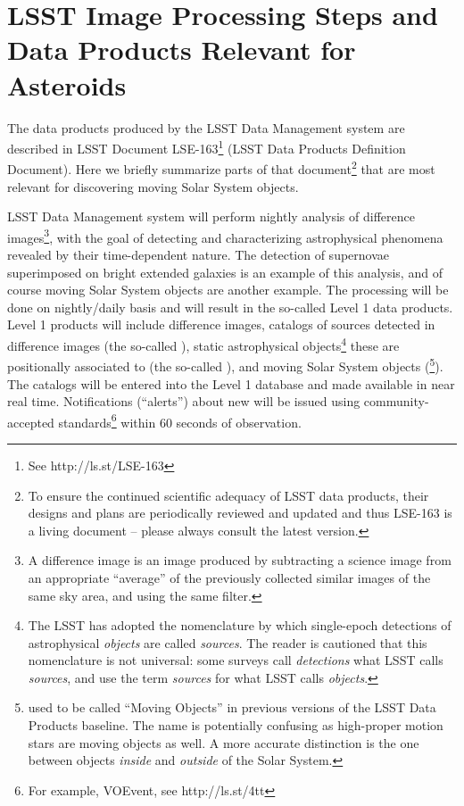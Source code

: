 \section{LSST Image Processing Steps and Data Products Relevant for Asteroids} \label{sec:AppA}

The data products produced by the LSST Data Management system are described in 
LSST Document LSE-163\footnote{See http://ls.st/LSE-163} (LSST Data Products
Definition Document). Here we briefly summarize parts of that
document\footnote{To ensure the continued scientific adequacy of LSST data 
products, their designs and plans are periodically reviewed and updated and
thus LSE-163 is a living document -- please always consult the latest version.}
that are most relevant for discovering moving Solar System objects. 

LSST Data Management system will perform nightly analysis of difference images\footnote{A difference
image is an image produced by subtracting a science image from an appropriate 
``average'' of the previously collected similar images of the same sky area, and using the 
same filter.}, with the goal of detecting and characterizing astrophysical phenomena 
revealed by their time-dependent nature. The detection of supernovae superimposed 
on bright extended galaxies is an example of this analysis, and of course moving Solar
System objects are another example. The processing will be done on nightly/daily 
basis and will result in the so-called Level 1 data products. Level 1 products will include 
difference images, catalogs of sources detected in difference images (the so-called
\DIASources), static astrophysical objects\footnote{The LSST has adopted the nomenclature by 
which single-epoch detections of astrophysical {\em objects} are called {\em sources}. 
The reader is cautioned that this nomenclature is not universal: some surveys call 
{\em detections} what LSST calls {\em sources}, and use the term {\em sources} for what 
LSST calls {\em objects}.} these \DIASources are positionally associated to (the so-called \DIAObjects), 
and moving Solar System objects (\SSObjects\footnote{\SSObjects used to be called 
``Moving Objects'' in previous versions of the LSST Data Products baseline. The name is 
potentially confusing as high-proper motion stars are moving objects as well. A more 
accurate distinction is the one between objects {\em inside} and {\em outside} of the Solar 
System.}). The catalogs will be entered into the Level 1 database and made available in near 
real time. Notifications (``alerts'') about new \DIASources will be issued using 
community-accepted standards\footnote{For example, VOEvent, see http://ls.st/4tt} within 
60 seconds of observation. 

